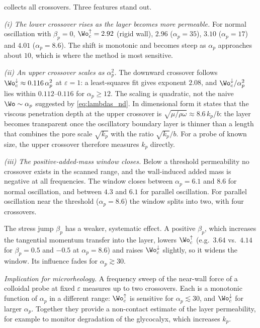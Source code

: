  collects all crossovers. Three features stand out.

\emph{(i) The lower crossover rises as the layer becomes more permeable.} For normal oscillation with $\beta_p=0$,
$\Wo_c^{\uparrow}=2.92$ (rigid wall), $2.96$ ($\alpha_p=35$), $3.10$ ($\alpha_p=17$) and $4.01$ ($\alpha_p=8.6$). The
shift is monotonic and becomes steep as $\alpha_p$ approaches about $10$, which is where the method is most sensitive.

\emph{(ii) An upper crossover scales as $\alpha_p^2$.} The downward crossover follows
$\Wo_c^{\downarrow}\approx0.116\,\alpha_p^2$ at $\varepsilon=1$: a least-squares fit gives exponent $2.08$, and
$\Wo_c^{\downarrow}/\alpha_p^2$ lies within $0.112$--$0.116$ for $\alpha_p\ge12$. The scaling is quadratic, not the naive $\Wo\sim\alpha_p$
suggested by \cref{eq:lambdas_nd}. In dimensional form it states that the viscous penetration depth at the upper
crossover is $\sqrt{\mu/\rho\omega}\approx8.6\,k_p/b$: the layer becomes transparent once the oscillatory boundary
layer is thinner than a length that combines the pore scale $\sqrt{k_p}$ with the ratio $\sqrt{k_p}/b$. For a probe of
known size, the upper crossover therefore measures $k_p$ directly. 

\emph{(iii) The positive-added-mass window closes.} Below a threshold permeability no crossover exists in the scanned range, and the wall-induced added mass is negative
at all frequencies. The window closes between $\alpha_p=6.1$ and $8.6$ for normal oscillation, and between $4.3$ and
$6.1$ for parallel oscillation. For parallel oscillation near the threshold ($\alpha_p=8.6$) the window splits into two,
with four crossovers.

The stress jump $\beta_p$ has a weaker, systematic effect. A positive $\beta_p$, which increases the tangential momentum
transfer into the layer, lowers $\Wo_c^{\uparrow}$ (e.g.\ $3.64$ vs.\ $4.14$ for $\beta_p=0.5$ and $-0.5$ at
$\alpha_p=8.6$) and raises $\Wo_c^{\downarrow}$ slightly, so it widens the window. Its influence fades for
$\alpha_p\gtrsim30$.

\emph{Implication for microrheology.} A frequency sweep of the near-wall force of a colloidal probe at fixed $\varepsilon$
measures up to two crossovers. Each is a monotonic function of $\alpha_p$ in a different range: $\Wo_c^{\uparrow}$ is
sensitive for $\alpha_p\lesssim30$, and $\Wo_c^{\downarrow}$ for larger $\alpha_p$. Together they provide a non-contact
estimate of the layer permeability, for example to monitor degradation of the glycocalyx, which increases $k_p$.


